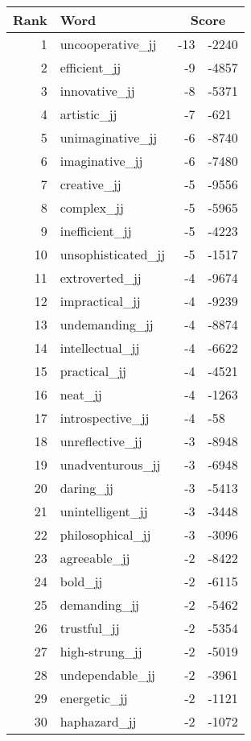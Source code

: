 \begin{longtable}[!htbp]{| rlr@{.}l |}
    \hline
    \textbf{Rank} & \textbf{Word} & \multicolumn{2}{c|}{\textbf{Score}} \\
    \hline
    \endhead
    1 & uncooperative\_jj & -13 & -2240 \\
    2 & efficient\_jj & -9 & -4857 \\
    3 & innovative\_jj & -8 & -5371 \\
    4 & artistic\_jj & -7 & -621 \\
    5 & unimaginative\_jj & -6 & -8740 \\
    6 & imaginative\_jj & -6 & -7480 \\
    7 & creative\_jj & -5 & -9556 \\
    8 & complex\_jj & -5 & -5965 \\
    9 & inefficient\_jj & -5 & -4223 \\
    10 & unsophisticated\_jj & -5 & -1517 \\
    11 & extroverted\_jj & -4 & -9674 \\
    12 & impractical\_jj & -4 & -9239 \\
    13 & undemanding\_jj & -4 & -8874 \\
    14 & intellectual\_jj & -4 & -6622 \\
    15 & practical\_jj & -4 & -4521 \\
    16 & neat\_jj & -4 & -1263 \\
    17 & introspective\_jj & -4 & -58 \\
    18 & unreflective\_jj & -3 & -8948 \\
    19 & unadventurous\_jj & -3 & -6948 \\
    20 & daring\_jj & -3 & -5413 \\
    21 & unintelligent\_jj & -3 & -3448 \\
    22 & philosophical\_jj & -3 & -3096 \\
    23 & agreeable\_jj & -2 & -8422 \\
    24 & bold\_jj & -2 & -6115 \\
    25 & demanding\_jj & -2 & -5462 \\
    26 & trustful\_jj & -2 & -5354 \\
    27 & high-strung\_jj & -2 & -5019 \\
    28 & undependable\_jj & -2 & -3961 \\
    29 & energetic\_jj & -2 & -1121 \\
    30 & haphazard\_jj & -2 & -1072 \\

\end{longtable}
